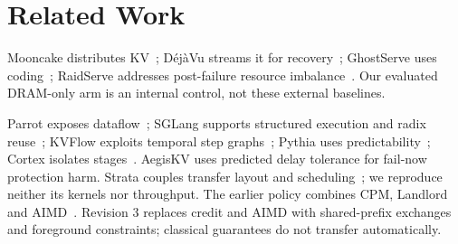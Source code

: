 \section{Related Work}
Mooncake distributes KV~\cite{qin2025mooncake}; D\'ej\`aVu streams it for
recovery~\cite{strati2024dejavu}; GhostServe uses coding~\cite{jayakody2026ghostserve};
RaidServe addresses post-failure resource imbalance~\cite{xu2026raidserve}.
Our evaluated DRAM-only arm is an internal control, not these external baselines.

Parrot exposes dataflow~\cite{lin2024parrot}; SGLang supports structured execution
and radix reuse~\cite{zheng2024sglang}; KVFlow exploits temporal step graphs~\cite{pan2025kvflow};
Pythia uses predictability~\cite{yu2026pythia}; Cortex isolates stages~\cite{pagonas2025cortex}.
AegisKV uses predicted delay tolerance for fail-now protection harm. Strata
couples transfer layout and scheduling~\cite{xie2026strata}; we reproduce neither
its kernels nor throughput. The earlier policy combines CPM, Landlord and
AIMD~\cite{kelley1959cpm,young2002landlord,chiu1989aimd}. Revision 3 replaces credit
and AIMD with shared-prefix exchanges and foreground constraints; classical
guarantees do not transfer automatically.
